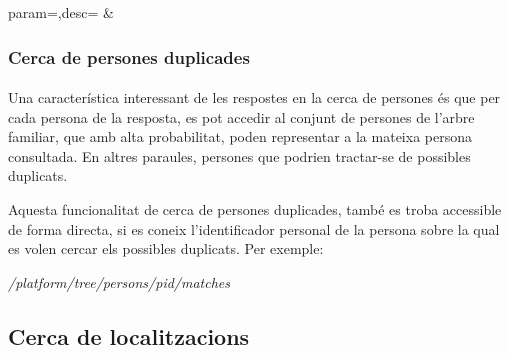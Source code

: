          \begin{center}
                  {param=\param,desc=\desc}
                  {\param&\desc}
          \end{center}


          \subsubsection{Cerca de persones duplicades}

          \paragraph{}
          Una característica interessant de les respostes en la cerca de persones és que per cada persona de la resposta, es pot accedir al conjunt de persones de l'arbre familiar, que amb alta probabilitat, poden representar a la mateixa persona consultada. En altres paraules, persones que podrien tractar-se de possibles duplicats.

          Aquesta funcionalitat de cerca de persones duplicades, també es troba accessible de forma directa, si es coneix l'identificador personal de la persona sobre la qual es volen cercar els possibles duplicats. Per exemple:

          \begin{displayquote}
              \emph{/platform/tree/persons/{pid}/matches}
          \end{displayquote}


    \subsection{Cerca de localitzacions}


